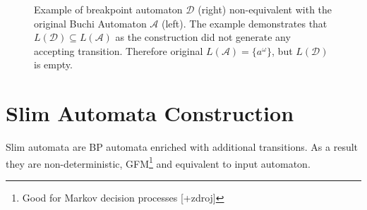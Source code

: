 \documentclass[
	digital
nolof, nolot
]{fithesis3}
\newcommand{\cA}{\mathcal{A}}
\newcommand{\cD}{\mathcal{D}}
\newcommand{\lA}{L(\cA)}
\newcommand{\lD}{L(\cD)}
\newcommand{\flushed}{\text{\emoji{flushed}}}
\newcommand{\hell}{\text{\emoji{fire}}}
\newcommand{\heaven}{\text{\emoji{innocent}}}
\begin{document}
			\begin{figure}[ht]
				\begin{center}
				\end{center}
				\caption{Example of breakpoint automaton $\cD$ (right) non-equivalent with the original Buchi Automaton $\cA$ (left). The example demonstrates that $\lD \subseteq \lA$ as the construction did not generate any accepting transition. Therefore original $\lA=\{a^\omega\}$, but $\lD$ is empty.}
				\label{fig:bp:non-equivalent}
			\end{figure}
			
			
			
			\section{Slim Automata Construction}\label{section:slim}
			
			
			
			Slim automata are BP automata enriched with additional transitions. As a result they are non-deterministic, GFM\footnote{Good for Markov decision processes [+zdroj]} and equivalent to input automaton.
			
\end{document}
